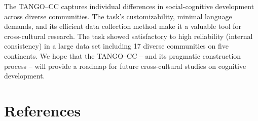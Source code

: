 \documentclass[
  man,floatsintext]{apa7}
\begin{document}
The TANGO--CC captures individual differences in social-cognitive development across diverse communities.
The task's customizability, minimal language demands, and its efficient data collection method make it a valuable tool for cross-cultural research.
The task showed satisfactory to high reliability (internal consistency) in a large data set including 17 diverse communities on five continents.
We hope that the TANGO--CC -- and its pragmatic construction process -- will provide a roadmap for future cross-cultural studies on cognitive development.

\newpage

\section{References}\label{references}

\begingroup
\setlength{\parindent}{-0.5in}
\setlength{\leftskip}{0.5in}
\end{document}
